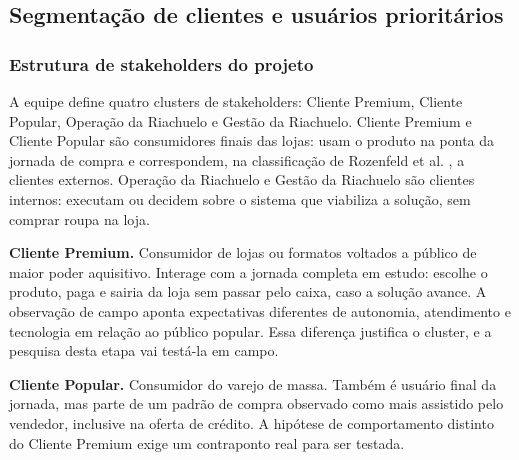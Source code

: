 %
%

\subsection{Segmentação de clientes e usuários prioritários}
\label{subsec:segmentacao_clientes_usuarios}

\subsubsection{Estrutura de stakeholders do projeto}
\label{subsubsec:segmentacao_estrutura}

A equipe define quatro clusters de stakeholders: Cliente Premium, Cliente Popular, Operação da Riachuelo e Gestão da Riachuelo. Cliente Premium e Cliente Popular são consumidores finais das lojas: usam o produto na ponta da jornada de compra e correspondem, na classificação de Rozenfeld et al. \cite{rozenfeld2006gestao}, a clientes externos. Operação da Riachuelo e Gestão da Riachuelo são clientes internos: executam ou decidem sobre o sistema que viabiliza a solução, sem comprar roupa na loja.

\textbf{Cliente Premium.} Consumidor de lojas ou formatos voltados a público de maior poder aquisitivo. Interage com a jornada completa em estudo: escolhe o produto, paga e sairia da loja sem passar pelo caixa, caso a solução avance. A observação de campo aponta expectativas diferentes de autonomia, atendimento e tecnologia em relação ao público popular. Essa diferença justifica o cluster, e a pesquisa desta etapa vai testá-la em campo.

\textbf{Cliente Popular.} Consumidor do varejo de massa. Também é usuário final da jornada, mas parte de um padrão de compra observado como mais assistido pelo vendedor, inclusive na oferta de crédito. A hipótese de comportamento distinto do Cliente Premium exige um contraponto real para ser testada.

